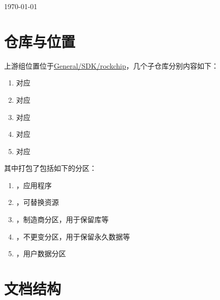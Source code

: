 \documentclass[UTF8]{ctexart}
\begin{document}
\vspace{\fill}

\begin{center}
    {\large \today}
\end{center}

\thispagestyle{empty}


\newpage
{}
\pagestyle{fancy}


\section*{仓库与位置}

上游组位置位于\href{http://10.42.0.252:12123/general/sdk/rockchip}{General/SDK/rockchip}，几个子仓库分别内容如下：

\begin{enumerate}
    \item {}对应
    \item {}对应
    \item {}对应
    \item {}对应
    \item {}对应
\end{enumerate}

\noindent 其中打包了包括如下的分区：

\begin{enumerate}
    \item {}，应用程序
    \item {}，可替换资源
    \item {}，制造商分区，用于保留库等
    \item {}，不更变分区，用于保留永久数据等
    \item {}，用户数据分区
\end{enumerate}

\section*{文档结构}
\end{document}
